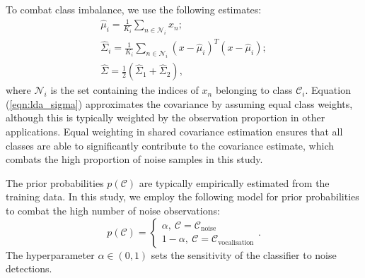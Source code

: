 {To combat class imbalance, we use the following estimates:
\begin{gather}
    \label{eqn:lda_median}
    \hat{\mu}_i = \frac{1}{K_i}\sum_{n \in \mathcal{N}_i} x_n ;\\
    \hat{\Sigma}_i = \frac{1}{K_i}\sum_{n \in \mathcal{N}_i} \left(x - \hat{\mu}_i\right)^T\left(x - \hat{\mu}_i\right);\\
    \label{eqn:lda_sigma}
    \hat{\Sigma} = \frac{1}{2}\left(\hat{\Sigma}_1 + \hat{\Sigma}_2 \right),
\end{gather}
where $\mathcal{N}_i$ is the set containing the indices of $x_n$ belonging to class $\mathcal{C}_i$. Equation (\ref{eqn:lda_sigma}) approximates the covariance by assuming equal class weights, although this is typically weighted by the observation proportion in other applications. Equal weighting in shared covariance estimation ensures that all classes are able to significantly contribute to the covariance estimate, which combats the high proportion of noise samples in this study.

The prior probabilities $p(\mathcal{C})$ are typically empirically estimated from the training data. In this study, we employ the following model for prior probabilities to combat the high number of noise observations:
\begin{equation}
    p(\mathcal{C}) = \begin{cases}
        \alpha, \ \mathcal{C} = \mathcal{C}_\text{noise}\\
        1-\alpha,\ \mathcal{C} = \mathcal{C}_\text{vocalisation}
    \end{cases}.
\end{equation}
The hyperparameter $\alpha \in (0,1)$ sets the sensitivity of the classifier to noise detections.



}

